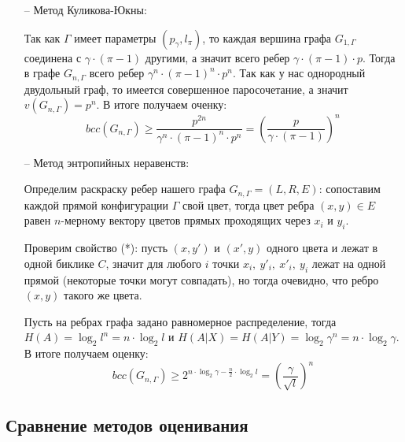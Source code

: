 \documentclass[a4paper]{article}
\newtheorem*{msolution}{Доказательство}
\begin{document}
\begin{itemize}[noitemsep]
\begin{msolution}
        Вернемся к доказательству леммы. Так как матрица графа $G_{n, \Gamma}$ есть не что иное, как 
        Кронекерово произведение $n$ матриц графа $G_{1, \Gamma}$, то мы можем найти трудное множество 
        размера $k^n$. $\square$
     \end{msolution}
     
     В итоге мы получили, что если $\Gamma$ является аналогом полного двудольного графа, то 
     $$bcc(G_{n, \Gamma}) \geq 2^n$$ иначе $$bcc(G_{n, \Gamma}) \geq 3^n$$
     
     \item[--] Метод Куликова-Юкны:
     
     Так как $\Gamma$ имеет параметры $(p_{\gamma}, l_{\pi})$, то каждая вершина графа $G_{1,\Gamma}$ 
     соединена с $\gamma\cdot (\pi - 1)$ другими, а значит всего ребер $\gamma\cdot (\pi - 1)\cdot p$. Тогда в графе 
     $G_{n, \Gamma}$ всего ребер $\gamma^n\cdot (\pi - 1)^n\cdot p^n$. Так как у нас однородный двудольный граф, 
     то имеется совершенное паросочетание, а значит $v(G_{n, \Gamma}) = p^n$. В итоге получаем оченку:
     $$bcc(G_{n,\Gamma}) \geq \frac{p^{2n}}{\gamma^n\cdot (\pi - 1)^n\cdot p^n} = \left(\frac{p}{\gamma\cdot (\pi -1)}\right)^n$$
     
     \item[--] Метод энтропийных неравенств:
     
     Определим раскраску ребер нашего графа $G_{n,\Gamma} = (L, R, E)$: сопоставим каждой прямой 
     конфигурации $\Gamma$ свой цвет, тогда цвет ребра $(x, y)\in E$ равен $n$-мерному вектору цветов 
     прямых проходящих через $x_i$ и  $y_i$.
     
     Проверим свойство (*): пусть $(x, y')$ и $(x', y)$ одного цвета и лежат в одной биклике $C$, значит 
     для любого $i$ точки $x_i,\ y'_i,\ x'_i,\ y_i$ лежат на одной прямой (некоторые точки могут совпадать), 
     но тогда очевидно, что ребро $(x, y)$ такого же цвета. 
     
     Пусть на ребрах графа задано равномерное распределение, тогда $H(A) = \log_2l^n = n\cdot\log_2l$ и 
     $H(A|X)=H(A|Y) = \log_2\gamma^n = n\cdot\log_2\gamma$. В итоге получаем оценку: $$bcc(G_{n, \Gamma}) \geq 
     2^{n\cdot\log_2\gamma - \frac{n}{2}\cdot\log_2l} = \left(\frac{\gamma}{\sqrt{l}}\right)^n$$
     
\end{itemize}

\subsection{Сравнение методов оценивания}
\end{document}
